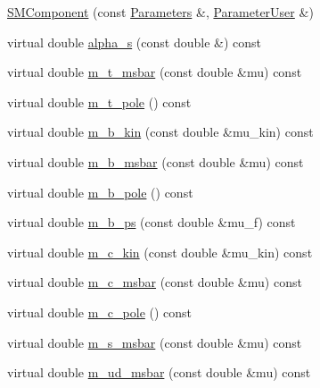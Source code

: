 \begin{DoxyCompactItemize}
\item 
\hyperlink{classeos_1_1SMComponent_3_01components_1_1QCD_01_4_a6a98003e7b150156579bb414cfffabb4}{SMComponent} (const \hyperlink{classeos_1_1Parameters}{Parameters} \&, \hyperlink{classeos_1_1ParameterUser}{ParameterUser} \&)
\item 
virtual double \hyperlink{classeos_1_1SMComponent_3_01components_1_1QCD_01_4_a8f06baa780a1f99f22f2e45c9463df36}{alpha\_\-s} (const double \&) const 
\item 
virtual double \hyperlink{classeos_1_1SMComponent_3_01components_1_1QCD_01_4_a6bda92aac898c86185a8f3fca6f575cf}{m\_\-t\_\-msbar} (const double \&mu) const 
\item 
virtual double \hyperlink{classeos_1_1SMComponent_3_01components_1_1QCD_01_4_a8c798c65f6fdf75c7f038e428134d026}{m\_\-t\_\-pole} () const 
\item 
virtual double \hyperlink{classeos_1_1SMComponent_3_01components_1_1QCD_01_4_a722ab7fc7efbfd60d0088e4349e29b5b}{m\_\-b\_\-kin} (const double \&mu\_\-kin) const 
\item 
virtual double \hyperlink{classeos_1_1SMComponent_3_01components_1_1QCD_01_4_a81b71218baa85173813f67b363c73924}{m\_\-b\_\-msbar} (const double \&mu) const 
\item 
virtual double \hyperlink{classeos_1_1SMComponent_3_01components_1_1QCD_01_4_ae2a177d11900636dec6d7d7c9040b9fb}{m\_\-b\_\-pole} () const 
\item 
virtual double \hyperlink{classeos_1_1SMComponent_3_01components_1_1QCD_01_4_a2f052ffa95426e07ab019fa275ce41d9}{m\_\-b\_\-ps} (const double \&mu\_\-f) const 
\item 
virtual double \hyperlink{classeos_1_1SMComponent_3_01components_1_1QCD_01_4_a346c272825a490a9f5884af8b8ceebfe}{m\_\-c\_\-kin} (const double \&mu\_\-kin) const 
\item 
virtual double \hyperlink{classeos_1_1SMComponent_3_01components_1_1QCD_01_4_af1f05d988210a50359490a150d9170e0}{m\_\-c\_\-msbar} (const double \&mu) const 
\item 
virtual double \hyperlink{classeos_1_1SMComponent_3_01components_1_1QCD_01_4_a013ddfb77a30fe05fd3593c1528331b0}{m\_\-c\_\-pole} () const 
\item 
virtual double \hyperlink{classeos_1_1SMComponent_3_01components_1_1QCD_01_4_a0d31a7565a92e0dca81e153932690945}{m\_\-s\_\-msbar} (const double \&mu) const 
\item 
virtual double \hyperlink{classeos_1_1SMComponent_3_01components_1_1QCD_01_4_aff5afae1cb8169135ad183db75836529}{m\_\-ud\_\-msbar} (const double \&mu) const 
\end{DoxyCompactItemize}
